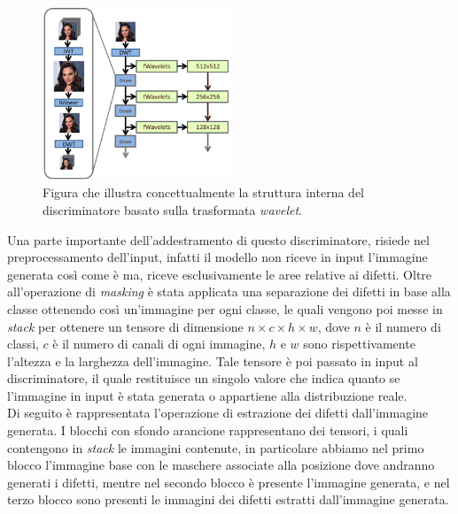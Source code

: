\begin{figure}[H]
    \centering
    \includegraphics[width=0.5\textwidth]{imgs/Coigan/swagan_discriminator.png}
    \caption{Figura che illustra concettualmente la struttura interna del discriminatore basato sulla trasformata \textit{wavelet}.}
    \label{fig:wavelet_discriminator}
\end{figure}

Una parte importante dell'addestramento di questo discriminatore, risiede nel preprocessamento dell'input, infatti il
modello non riceve in input l'immagine generata così come è ma, riceve esclusivamente le aree relative ai difetti.
Oltre all'operazione di \textit{masking} è stata applicata una separazione dei difetti in base alla classe ottenendo così
un'immagine per ogni classe, le quali vengono poi messe in \textit{stack} per ottenere un tensore di dimensione $n \times c \times h \times w$,
dove $n$ è il numero di classi, $c$ è il numero di canali di ogni immagine, $h$ e $w$ sono rispettivamente l'altezza e la larghezza dell'immagine.
Tale tensore è poi passato in input al discriminatore, il quale restituisce un singolo valore che indica quanto se l'immagine in input è stata generata o appartiene
alla distribuzione reale.\\
Di seguito è rappresentata l'operazione di estrazione dei difetti dall'immagine generata. 
I blocchi con sfondo arancione rappresentano dei tensori, i quali contengono in \textit{stack} le immagini contenute,
in particolare abbiamo nel primo blocco l'immagine base con le maschere associate alla posizione dove andranno generati i difetti,
mentre nel secondo blocco è presente l'immagine generata, e nel terzo blocco sono presenti le immagini dei difetti estratti dall'immagine generata.

